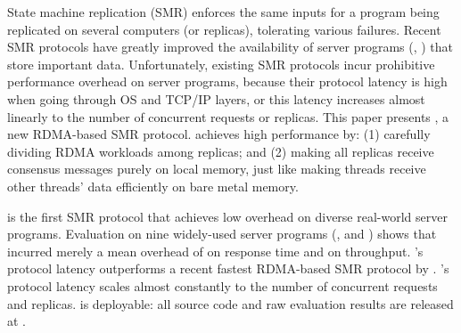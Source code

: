 State machine replication (SMR) enforces the same inputs 
for a program being replicated on several computers (or replicas), 
tolerating various failures. Recent SMR protocols have greatly improved
the availability of server programs (\eg, \redis) that store important data. 
Unfortunately, existing SMR protocols incur prohibitive performance overhead on 
server programs, because their protocol latency is high when going through OS 
and TCP/IP layers, or this latency increases almost linearly to the number of 
concurrent requests or replicas. This paper presents \xxx, a new 
RDMA-based SMR protocol. \xxx achieves high performance by: (1) carefully 
dividing RDMA workloads among replicas; and (2) making all replicas receive 
consensus messages purely on local memory, just like making threads receive 
other threads' data efficiently on bare metal memory.


\xxx is the first SMR protocol that achieves low overhead on diverse 
real-world server programs. Evaluation on nine widely-used server programs (\eg, 
\redis and \mysql) shows that \xxx incurred merely a mean overhead of 
\latencyoverhead on response time and \tputoverhead on throughput.
\xxx's protocol latency outperforms a recent fastest RDMA-based SMR protocol 
by \fasterDARE. \xxx's protocol latency scales almost constantly to the number 
of concurrent requests and replicas. \xxx is deployable: all source code and 
raw evaluation results are released at \github.



